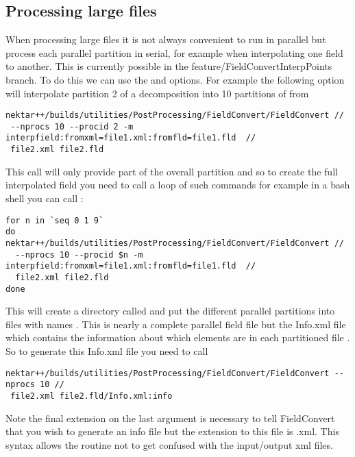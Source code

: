 \subsection{Processing large files}
When processing large files it is not always convenient to run in parallel but process each parallel partition in serial, for example when interpolating one field to another. This is currently possible in the feature/FieldConvertInterpPoints branch. To do this we can use the  and  options. For example the following option will interpolate partition 2 of a decomposition into 10 partitions of  from 
\begin{lstlisting}[style=BashInputStyle] 
nektar++/builds/utilities/PostProcessing/FieldConvert/FieldConvert // 
 --nprocs 10 --procid 2 -m interpfield:fromxml=file1.xml:fromfld=file1.fld  //
 file2.xml file2.fld
\end{lstlisting}
This call will only provide part of the overall partition and so to create the full interpolated field you need to call a loop of such commands for example in a bash shell you can call :
\begin{lstlisting}[style=BashInputStyle] 
for n in `seq 0 1 9`
do 
nektar++/builds/utilities/PostProcessing/FieldConvert/FieldConvert //
  --nprocs 10 --procid $n -m interpfield:fromxml=file1.xml:fromfld=file1.fld  //
  file2.xml file2.fld
done
\end{lstlisting}

This will create a directory called  and put the different parallel partitions into files with names . This is nearly a complete parallel field file but the Info.xml file which contains the information about which elements are in each partitioned file . So to generate this Info.xml file you need to call
\begin{lstlisting}[style=BashInputStyle] 
nektar++/builds/utilities/PostProcessing/FieldConvert/FieldConvert --nprocs 10 //
 file2.xml file2.fld/Info.xml:info
\end{lstlisting}
Note the final  extension on the last argument is necessary to tell FieldConvert that you wish to generate an info file but the extension to this file is .xml. This syntax allows the routine not to get confused with the input/output xml files.
